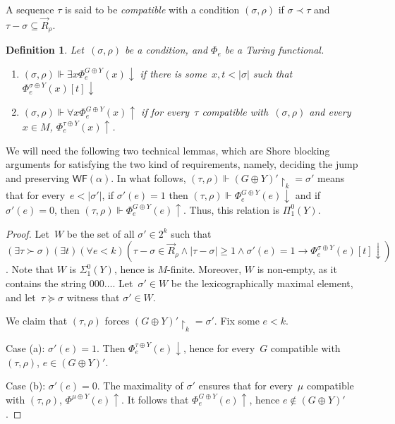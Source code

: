 \documentclass{article}
\numberwithin{theorem}{section}
\newtheorem{lemma}[theorem]{Lemma}
\newtheorem{definition}[theorem]{Definition}
\newcommand{\WF}{\mathsf{WF}}
\newcommand{\uh}[0]{{\upharpoonright}}
\begin{document}
A sequence $\tau$ is said to be \emph{compatible} with a condition $(\sigma,\rho)$ if $\sigma \prec \tau$ and  $\tau - \sigma \subseteq \vec{R}_{\rho}$.

\begin{definition}
Let~$(\sigma, \rho)$ be a condition, and $\Phi_e$ be a Turing functional.
\begin{enumerate}
    \item[1.] $(\sigma, \rho) \Vdash \exists x \Phi^{G \oplus Y}_e(x)\downarrow$ if there is some~$x, t < |\sigma|$ such that $\Phi^{\sigma \oplus Y}_e(x)[t]\downarrow$
    \item[2.] $(\sigma, \rho) \Vdash \forall x \Phi^{G \oplus Y}_e(x)\uparrow$ if for every~$\tau$ compatible with~$(\sigma, \rho)$ and every~$x \in M$, $\Phi^{\tau \oplus Y}_e(x)\uparrow$.
\end{enumerate}
\end{definition}

We will need the following two technical lemmas, which are Shore blocking arguments for satisfying the two kind of requirements, namely, deciding the jump and preserving $\WF(\alpha)$. In what follows, $(\tau, \rho) \Vdash (G \oplus Y)' \uh_k = \sigma'$ means that for every~$e < |\sigma'|$, if $\sigma'(e) = 1$ then $(\tau, \rho) \Vdash \Phi^{G \oplus Y}_e(e)\downarrow$ and if $\sigma'(e) = 0$, then $(\tau, \rho) \Vdash \Phi^{G \oplus Y}_e(e)\uparrow$. Thus, this relation is $\Pi^0_1(Y)$.


\begin{proof}
Let~$W$ be the set of all $\sigma' \in 2^k$ such that $(\exists \tau \succ \sigma)(\exists t)(\forall e < k)(\tau - \sigma \in \vec{R}_\rho \wedge |\tau - \sigma| \geq 1 \wedge \sigma'(e) = 1 \to \Phi_e^{\sigma \oplus Y}(e)[t] \downarrow)$.
Note that $W$ is $\Sigma^0_1(Y)$, hence is $M$-finite. Moreover, $W$ is non-empty, as it contains the string $000\dots$. Let~$\sigma' \in W$ be the lexicographically maximal element, and let~$\tau \succeq \sigma$ witness that $\sigma' \in W$.

We claim that $(\tau, \rho)$ forces $(G \oplus Y)' \uh_k = \sigma'$.
Fix some $e < k$.

Case (a): $\sigma'(e) = 1$. Then $\Phi_e^{\tau \oplus Y}(e)\downarrow$, hence for every~$G$ compatible with $(\tau, \rho)$, $e \in (G \oplus Y)'$.

Case (b): $\sigma'(e) = 0$. The maximality of $\sigma'$ ensures that for every~$\mu$ compatible with $(\tau, \rho)$, $\Phi^{\mu \oplus Y}(e)\uparrow$. It follows that $\Phi^{G \oplus Y}_e(e)\uparrow$, hence $e \not \in (G \oplus Y)'$.
\end{proof}
\end{document}
